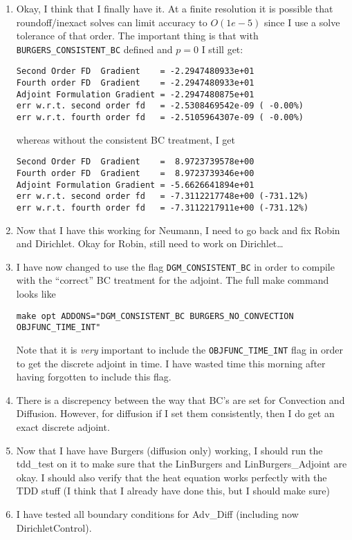 \documentclass[12pt]{article}
\begin{document}
\begin{enumerate}
\item Okay, I think that I finally have it.  At a finite resolution it is
  possible that roundoff/inexact solves can limit accuracy to $O(1e-5)$ since
  I use a solve tolerance of that order.  The important thing is that with
  {\tt BURGERS\_CONSISTENT\_BC} defined and $p=0$ I still get:
\begin{verbatim}
Second Order FD  Gradient    = -2.2947480933e+01
Fourth order FD  Gradient    = -2.2947480933e+01
Adjoint Formulation Gradient = -2.2947480875e+01
err w.r.t. second order fd   = -2.5308469542e-09 ( -0.00%)
err w.r.t. fourth order fd   = -2.5105964307e-09 ( -0.00%)
\end{verbatim}
whereas without the consistent BC treatment, I get
\begin{verbatim}
Second Order FD  Gradient    =  8.9723739578e+00
Fourth order FD  Gradient    =  8.9723739346e+00
Adjoint Formulation Gradient = -5.6626641894e+01
err w.r.t. second order fd   = -7.3112217748e+00 (-731.12%)
err w.r.t. fourth order fd   = -7.3112217911e+00 (-731.12%)
\end{verbatim}

\item Now that I have this working for Neumann, I need to go back and fix
  Robin and Dirichlet.  Okay for Robin, still need to work on Dirichlet\dots

\item I have now changed to use the flag {\tt DGM\_CONSISTENT\_BC} in order to
  compile with the ``correct'' BC treatment for the adjoint.  The full make
  command looks like
\begin{verbatim}
make opt ADDONS="DGM_CONSISTENT_BC BURGERS_NO_CONVECTION OBJFUNC_TIME_INT"
\end{verbatim}
Note that it is {\em very} important to include the {\tt OBJFUNC\_TIME\_INT}
flag in order to get the discrete adjoint in time.  I have wasted time this
morning after having forgotten to include this flag.

\item There is a discrepency between the way that BC's are set for Convection
  and Diffusion.  However, for diffusion if I set them consistently, then I do
  get an exact discrete adjoint.

\item Now that I have have Burgers (diffusion only) working, I should run the
  tdd\_test on it to make sure that the LinBurgers and LinBurgers\_Adjoint are
  okay.  I should also verify that the heat equation works perfectly with the
  TDD stuff (I think that I already have done this, but I should make sure)

\item I have tested all boundary conditions for Adv\_Diff (including now
  DirichletControl).

\end{enumerate}
\end{document}
